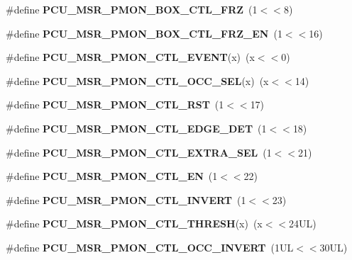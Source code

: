 \begin{DoxyCompactItemize}
\item 
\#define {\bfseries P\+C\+U\+\_\+\+M\+S\+R\+\_\+\+P\+M\+O\+N\+\_\+\+B\+O\+X\+\_\+\+C\+T\+L\+\_\+\+F\+RZ}~(1$<$$<$8)\label{types_8h_a3bc14b2ee027440b7421980f6ce8ef67}

\item 
\#define {\bfseries P\+C\+U\+\_\+\+M\+S\+R\+\_\+\+P\+M\+O\+N\+\_\+\+B\+O\+X\+\_\+\+C\+T\+L\+\_\+\+F\+R\+Z\+\_\+\+EN}~(1$<$$<$16)\label{types_8h_ab1a7a6f5d6975ed746bd7a7580c2a8a5}

\item 
\#define {\bfseries P\+C\+U\+\_\+\+M\+S\+R\+\_\+\+P\+M\+O\+N\+\_\+\+C\+T\+L\+\_\+\+E\+V\+E\+NT}(x)~(x$<$$<$0)\label{types_8h_a83fbe5979fa825319e970545a9e19f00}

\item 
\#define {\bfseries P\+C\+U\+\_\+\+M\+S\+R\+\_\+\+P\+M\+O\+N\+\_\+\+C\+T\+L\+\_\+\+O\+C\+C\+\_\+\+S\+EL}(x)~(x$<$$<$14)\label{types_8h_ab9900f6f77c855389143ff08432a5df9}

\item 
\#define {\bfseries P\+C\+U\+\_\+\+M\+S\+R\+\_\+\+P\+M\+O\+N\+\_\+\+C\+T\+L\+\_\+\+R\+ST}~(1$<$$<$17)\label{types_8h_a82e19ea013584abedf7586ea123f9279}

\item 
\#define {\bfseries P\+C\+U\+\_\+\+M\+S\+R\+\_\+\+P\+M\+O\+N\+\_\+\+C\+T\+L\+\_\+\+E\+D\+G\+E\+\_\+\+D\+ET}~(1$<$$<$18)\label{types_8h_a532fef251bd127d9c02ce16cc3326334}

\item 
\#define {\bfseries P\+C\+U\+\_\+\+M\+S\+R\+\_\+\+P\+M\+O\+N\+\_\+\+C\+T\+L\+\_\+\+E\+X\+T\+R\+A\+\_\+\+S\+EL}~(1$<$$<$21)\label{types_8h_a9635a71dd27c355a9c98b73267d2a15e}

\item 
\#define {\bfseries P\+C\+U\+\_\+\+M\+S\+R\+\_\+\+P\+M\+O\+N\+\_\+\+C\+T\+L\+\_\+\+EN}~(1$<$$<$22)\label{types_8h_a1e9aab2a6f0dbcb84d248dfbe5178f83}

\item 
\#define {\bfseries P\+C\+U\+\_\+\+M\+S\+R\+\_\+\+P\+M\+O\+N\+\_\+\+C\+T\+L\+\_\+\+I\+N\+V\+E\+RT}~(1$<$$<$23)\label{types_8h_a7761666c999fba919904ca732e0f8c5d}

\item 
\#define {\bfseries P\+C\+U\+\_\+\+M\+S\+R\+\_\+\+P\+M\+O\+N\+\_\+\+C\+T\+L\+\_\+\+T\+H\+R\+E\+SH}(x)~(x$<$$<$24\+U\+L)\label{types_8h_a043c9514bf4ca2382f229736555de524}

\item 
\#define {\bfseries P\+C\+U\+\_\+\+M\+S\+R\+\_\+\+P\+M\+O\+N\+\_\+\+C\+T\+L\+\_\+\+O\+C\+C\+\_\+\+I\+N\+V\+E\+RT}~(1\+U\+L$<$$<$30\+U\+L)\label{types_8h_a73449775204af16f448758ea9338aa4f}


\end{DoxyCompactItemize}
